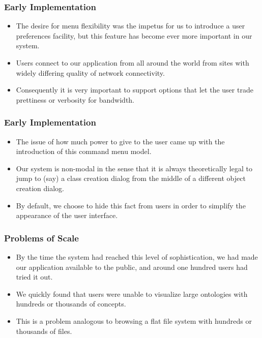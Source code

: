 \documentclass{beamer}
\begin{document}
\begin{frame}
\frametitle{Early Implementation}

\begin{itemize}
\item The desire for menu flexibility was the impetus for us to introduce a user preferences facility, but this feature has become ever more important in our system.
\item Users connect to our application from all around the world from sites with widely differing quality of network connectivity.
\item Consequently it is very important to support options that let the user trade prettiness or verbosity for bandwidth.
\end{itemize}

\end{frame}

\begin{frame}
\frametitle{Early Implementation}

\begin{itemize}
\item The issue of how much power to give to the user came up with the introduction of this command menu model.
\item Our system is non-modal in the sense that it is always theoretically legal to jump to (say) a class creation dialog from the middle of a different object creation dialog.
\item By default, we choose to hide this fact from users in order to simplify the appearance of the user interface.
\end{itemize}

\end{frame}

\begin{frame}
\frametitle{Problems of Scale}

\begin{itemize}
\item By the time the system had reached this level of sophistication, we had made our application available to the public, and around one hundred users had tried it out.
\item We quickly found that users were unable to visualize large ontologies with hundreds or thousands of concepts.
\item This is a problem analogous to browsing a flat file system with hundreds or thousands of files.
\end{itemize}

\end{frame}
\end{document}
